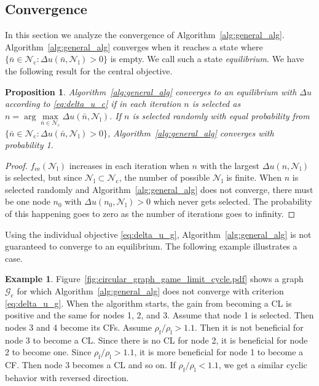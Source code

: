 \documentclass[letterpaper,10pt,conference,twocolumn]{IEEEtran}
\newcommand{\set}[1]{\mathcal{#1}}
\newcommand{\op}[1]{\mathrm{#1}}
\newtheorem{prop}{Proposition}
\theoremstyle{definition}
\newtheorem{example}{Example}
\begin{document}
\subsection{Convergence}
In this section we analyze the convergence of Algorithm~\ref{alg:general_alg}. Algorithm~\ref{alg:general_alg} converges when it reaches a state where $\{\bar{n} \in \set{N}_\op{c}: \Delta u(\bar{n},\set{N}_\op{l}) > 0\}$ is empty. We call such a state \textit{equilibrium}.
We have the following result for the central objective.
\begin{prop}
 Algorithm~\ref{alg:general_alg} converges to an equilibrium with $\Delta u$ according to \eqref{eq:delta_u_c} if in each iteration $n$ is selected as $n = \arg \max\limits_{\bar{n} \in \set{N}_\op{c}} \Delta u(\bar{n},\set{N}_\op{l})$. If $n$ is selected randomly with equal probability from $\{\bar{n} \in \set{N}_\op{c}: \Delta u(\bar{n},\set{N}_\op{l}) > 0\}$, Algorithm~\ref{alg:general_alg} converges with probability 1.
\end{prop}
\begin{proof}
 $f_\op{ce}(\set{N}_\op{l})$ increases in each iteration when $n$ with the largest $\Delta u(n,\set{N}_\op{l})$ is selected, but since $\set{N}_\op{l} \subset \set{N}_\op{c}$, the number of possible $\set{N}_\op{l}$ is finite. When $n$ is selected randomly and Algorithm~\ref{alg:general_alg} does not converge, there must be one node $n_0$ with $\Delta u(n_0,\set{N}_\op{l}) > 0$ which never gets selected. The probability of this happening goes to zero as the number of iterations goes to infinity.
\end{proof}

Using the individual objective \eqref{eq:delta_u_g}, Algorithm~\ref{alg:general_alg} is not guaranteed to converge to an equilibrium. The following example illustrates a case.
\begin{example}\label{ex:limit_cycle}
 Figure~\ref{fig:circular_graph_game_limit_cycle.pdf} shows a graph $\set{G}_\op{c}$ for which Algorithm~\ref{alg:general_alg} does not converge with criterion \eqref{eq:delta_u_g}. When the algorithm starts, the gain from becoming a CL is positive and the same for nodes 1, 2, and 3. Assume that node 1 is selected. Then nodes 3 and 4 become its CFs. Assume $\rho_\op{f}/\rho_\op{l} > 1.1$. Then it is not beneficial for node 3 to become a CL. Since there is no CL for node 2, it is beneficial for node 2 to become one. Since $\rho_\op{f}/\rho_\op{l} > 1.1$, it is more beneficial for node 1 to become a CF. Then node 3 becomes a CL and so on. If $\rho_\op{f}/\rho_\op{l} < 1.1$, we get a similar cyclic behavior with reversed direction.
\end{example}
\end{document}
